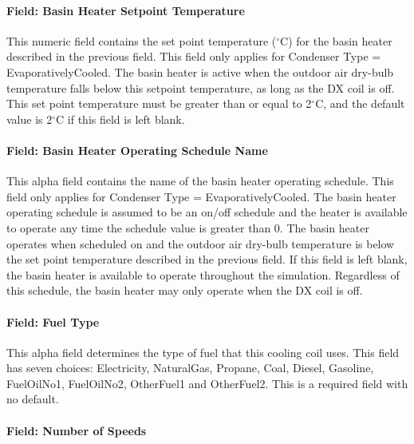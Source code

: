 \paragraph{Field: Basin Heater Setpoint Temperature}\label{field-basin-heater-setpoint-temperature-3-000}

This numeric field contains the set point temperature ($^\circ$C) for the basin heater described in the previous field. This field only applies for Condenser Type = EvaporativelyCooled. The basin heater is active when the outdoor air dry-bulb temperature falls below this setpoint temperature, as long as the DX coil is off. This set point temperature must be greater than or equal to 2$^\circ$C, and the default value is 2$^\circ$C if this field is left blank.

\paragraph{Field: Basin Heater Operating Schedule Name}\label{field-basin-heater-operating-schedule-name-3-000}

This alpha field contains the name of the basin heater operating schedule. This field only applies for Condenser Type = EvaporativelyCooled. The basin heater operating schedule is assumed to be an on/off schedule and the heater is available to operate any time the schedule value is greater than 0. The basin heater operates when scheduled on and the outdoor air dry-bulb temperature is below the set point temperature described in the previous field. If this field is left blank, the basin heater is available to operate throughout the simulation. Regardless of this schedule, the basin heater may only operate when the DX coil is off.

\paragraph{Field: Fuel Type}\label{field-fuel-type-000}

This alpha field determines the type of fuel that this cooling coil uses. This field has seven choices: Electricity, NaturalGas, Propane, Coal, Diesel, Gasoline, FuelOilNo1, FuelOilNo2, OtherFuel1 and OtherFuel2. This is a required field with no default.

\paragraph{Field: Number of Speeds}\label{field-number-of-speeds}

